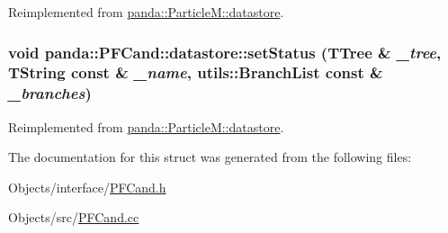 Reimplemented from \hyperlink{structpanda_1_1ParticleM_1_1datastore_ab9f9e7afb145c12941baa10892ed1811}{panda::ParticleM::datastore}.\hypertarget{structpanda_1_1PFCand_1_1datastore_a7efac265d60666c7ce27d78adbbf0fbb}{
\subsubsection[{setStatus}]{\setlength{\rightskip}{0pt plus 5cm}void panda::PFCand::datastore::setStatus (TTree \& {\em \_\-tree}, \/  TString const \& {\em \_\-name}, \/  {\bf utils::BranchList} const \& {\em \_\-branches})}}
\label{structpanda_1_1PFCand_1_1datastore_a7efac265d60666c7ce27d78adbbf0fbb}


Reimplemented from \hyperlink{structpanda_1_1ParticleM_1_1datastore_a0329bec2c84d16ff16e15824890e7a86}{panda::ParticleM::datastore}.

The documentation for this struct was generated from the following files:\begin{DoxyCompactItemize}
\item 
Objects/interface/\hyperlink{PFCand_8h}{PFCand.h}\item 
Objects/src/\hyperlink{PFCand_8cc}{PFCand.cc}\end{DoxyCompactItemize}

